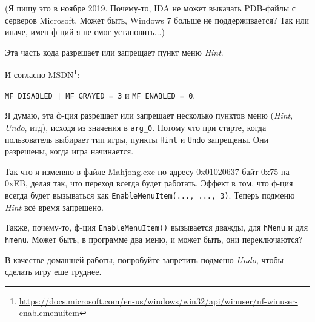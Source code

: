 (Я пишу это в ноябре 2019. Почему-то, IDA не может выкачать PDB-файлы с серверов Microsoft. Может быть, Windows 7 больше не поддерживается?
Так или иначе, имен ф-ций я не смог установить...)



Эта часть кода разрешает или запрещает пункт меню \emph{Hint}.

И согласно MSDN\footnote{\url{https://docs.microsoft.com/en-us/windows/win32/api/winuser/nf-winuser-enablemenuitem}}:

\verb$MF_DISABLED | MF_GRAYED = 3$ и \verb|MF_ENABLED = 0|.

Я думаю, эта ф-ция разрешает или запрещает несколько пунктов меню (\emph{Hint}, \emph{Undo}, итд), исходя из значения в \verb|arg_0|.
Потому что при старте, когда пользователь выбирает тип игры, пункты \verb|Hint| и \verb|Undo| запрещены.
Они разрешены, когда игра начинается.

Так что я изменяю в файле Mahjong.exe по адресу 0x01020637 байт 0x75 на 0xEB, делая так, что переход  всегда будет работать.
Эффект в том, что ф-ция всегда будет вызываться как \verb|EnableMenuItem(..., ..., 3)|.
Теперь подменю \emph{Hint} всё время запрещено.

Также, почему-то, ф-ция \verb|EnableMenuItem()| вызывается дважды, для \verb|hMenu| и для \verb|hmenu|.
Может быть, в программе два меню, и может быть, они переключаются?

В качестве домашней работы, попробуйте запретить подменю \emph{Undo}, чтобы сделать игру еще труднее.
